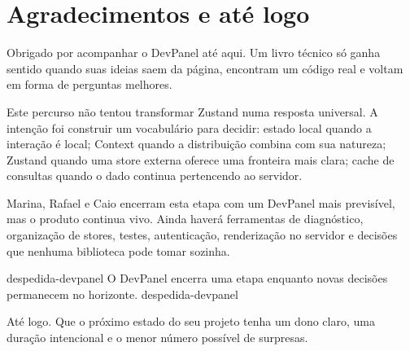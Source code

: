 \chapter*{Agradecimentos e até logo}

Obrigado por acompanhar o DevPanel até aqui. Um livro técnico só ganha sentido
quando suas ideias saem da página, encontram um código real e voltam em forma de
perguntas melhores.

Este percurso não tentou transformar Zustand numa resposta universal. A intenção
foi construir um vocabulário para decidir: estado local quando a interação é
local; Context quando a distribuição combina com sua natureza; Zustand quando
uma store externa oferece uma fronteira mais clara; cache de consultas quando o
dado continua pertencendo ao servidor.

Marina, Rafael e Caio encerram esta etapa com um DevPanel mais previsível, mas o
produto continua vivo. Ainda haverá ferramentas de diagnóstico, organização de
stores, testes, autenticação, renderização no servidor e decisões que nenhuma
biblioteca pode tomar sozinha.

\imagemcapitulo
  {despedida-devpanel}
  {O DevPanel encerra uma etapa enquanto novas decisões permanecem no horizonte.}
  {despedida-devpanel}

Até logo. Que o próximo estado do seu projeto tenha um dono claro, uma duração
intencional e o menor número possível de surpresas.
